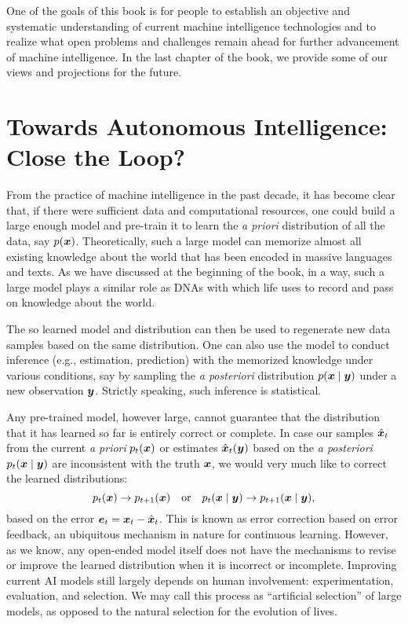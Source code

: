 \documentclass[../../book-main.tex]{subfiles}
\begin{document}
One of the goals of this book is for people to establish an objective and systematic understanding of current machine intelligence technologies and to realize what open problems and challenges remain ahead for further advancement of machine intelligence. In the last chapter of the book, we provide some of our views and projections for the future. 

\section{Towards Autonomous Intelligence: Close the Loop?}
From the practice of machine intelligence in the past decade, it has become clear that, if there were sufficient data and computational resources, one could build a large enough model and pre-train it to learn the {\em a priori} distribution of all the data, say $p(\bm{x})$. Theoretically, such a large model can memorize almost all existing knowledge about the world that has been encoded in massive languages and texts. As we have discussed at the beginning of the book, in a way, such a large model plays a similar role as DNAs with which life uses to record and pass on knowledge about the world.  

The so learned model and distribution can then be used to regenerate new data samples based on the same distribution. One can also use the model to conduct inference (e.g., estimation, prediction) with the memorized knowledge under various conditions, say by sampling the {\em a posteriori} distribution $p(\bm{x}\mid \bm{y})$ under a new observation $\bm{y}$. Strictly speaking, such inference is statistical. 

Any pre-trained model, however large, cannot guarantee that the distribution that it has learned so far is entirely correct or complete. In case our samples  $\hat{\bm{x}}_t$ from the current {\em a priori} $p_t(\bm{x})$ or estimates $\hat{\bm{x}}_t(\bm{y})$ based on the {\em a posteriori} $p_t(\bm{x}\mid \bm{y})$ are inconsistent with the truth $\bm{x}$, we would very much like to correct the learned distributions:
\begin{equation}
    p_t(\bm{x}) \rightarrow p_{t+1}(\bm{x}) \quad \mbox{or}\quad p_t(\bm{x}\mid \bm{y}) \rightarrow p_{t+1}(\bm{x}\mid \bm{y}),
\end{equation}
based on the error $\boldsymbol{e}_t = \bm{x}_t - \hat{\bm{x}}_t$. This is known as error correction based on error feedback, an ubiquitous mechanism in nature for continuous learning. However, as we know, any open-ended model itself does not have the mechanisms to revise or improve the learned distribution when it is incorrect or incomplete. Improving current AI models still largely depends on human involvement: experimentation, evaluation, and selection. We may call this process as ``artificial selection'' of large models, as opposed to the natural selection for the evolution of lives. 
\end{document}
